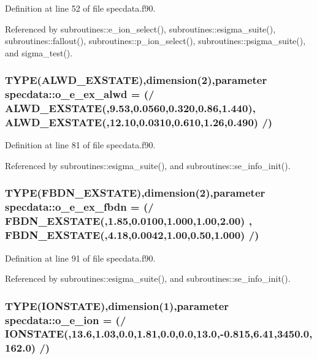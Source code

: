 Definition at line 52 of file specdata.f90.

Referenced by subroutines::e\_\-ion\_\-select(), subroutines::esigma\_\-suite(), subroutines::fallout(), subroutines::p\_\-ion\_\-select(), subroutines::psigma\_\-suite(), and sigma\_\-test().\hypertarget{namespacespecdata_ac6de9abf8a4350031cdeed967f2b21b6}{
\subsubsection[{o\_\-e\_\-ex\_\-alwd}]{\setlength{\rightskip}{0pt plus 5cm}TYPE(ALWD\_\-EXSTATE),dimension(2),parameter {\bf specdata::o\_\-e\_\-ex\_\-alwd} = (/ ALWD\_\-EXSTATE(,9.53,0.0560,0.320,0.86,1.440), ALWD\_\-EXSTATE(,12.10,0.0310,0.610,1.26,0.490) /)}}
\label{namespacespecdata_ac6de9abf8a4350031cdeed967f2b21b6}


Definition at line 81 of file specdata.f90.

Referenced by subroutines::esigma\_\-suite(), and subroutines::se\_\-info\_\-init().\hypertarget{namespacespecdata_a31f902ca9efd2ca7817a66af34743c3d}{
\subsubsection[{o\_\-e\_\-ex\_\-fbdn}]{\setlength{\rightskip}{0pt plus 5cm}TYPE(FBDN\_\-EXSTATE),dimension(2),parameter {\bf specdata::o\_\-e\_\-ex\_\-fbdn} = (/ FBDN\_\-EXSTATE(,1.85,0.0100,1.000,1.00,2.00) , FBDN\_\-EXSTATE(,4.18,0.0042,1.00,0.50,1.000) /)}}
\label{namespacespecdata_a31f902ca9efd2ca7817a66af34743c3d}


Definition at line 91 of file specdata.f90.

Referenced by subroutines::esigma\_\-suite(), and subroutines::se\_\-info\_\-init().\hypertarget{namespacespecdata_aa92d120444752fc22443b31d087da308}{
\subsubsection[{o\_\-e\_\-ion}]{\setlength{\rightskip}{0pt plus 5cm}TYPE(IONSTATE),dimension(1),parameter {\bf specdata::o\_\-e\_\-ion} = (/ IONSTATE(,13.6,1.03,0.0,1.81,0.0,0.0,13.0,-\/0.815,6.41,3450.0,162.0) /)}}
\label{namespacespecdata_aa92d120444752fc22443b31d087da308}


